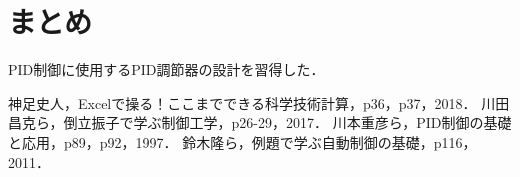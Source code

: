 \documentclass[12pt]{jsarticle}
\begin{document}
\section{まとめ}
PID制御に使用するPID調節器の設計を習得した．

\begin{thebibliography}{9}
   神足史人，Excelで操る！ここまでできる科学技術計算，p36，p37，2018．
   川田昌克ら，倒立振子で学ぶ制御工学，p26-29，2017．
   川本重彦ら，PID制御の基礎と応用，p89，p92，1997．
   鈴木隆ら，例題で学ぶ自動制御の基礎，p116，2011．
\end{thebibliography}
\end{document}
